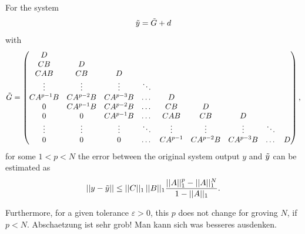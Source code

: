 	\begin{theo}
		For the system 
		\begin{align}
		\tilde{y} = \tilde{G} + d 
		\end{align}
		with 
		\begin{align}
		\tilde{G} = \begin{pmatrix}
		D  \\
		CB & D \\
		C A B & CB & D\\
		\vdots & \vdots & \vdots & \ddots \\
		C A^{p-1} B & C A^{p-2}B & C A^{p-3}B &\dots& D \\
		0           & C A^{p-1} B & C A^{p-2} B & \dots & CB & D\\
		0 & 0 & C A^{p-1} B & \dots & CAB & CB & D \\
		\vdots & \vdots & \vdots & \ddots & \vdots & \vdots & \vdots & \ddots \\
		0 & 0 & 0 & \dots & C A^{p-1}& C A^{p-2}B& CA^{p-3}B &\dots & D
		\end{pmatrix},
		\end{align}
		for some $1<p<N$
		the error between the original system output $y$ and $\tilde{y}$ can be estimated as 
		\begin{align}
		||y - \tilde{y}|| \leq ||C||_1 \, ||B||_1 \frac{||A||_1^p - ||A||_1^{N}}{1 - ||A||_1}. 
		\end{align}
		
		Furthermore, for a given tolerance $\varepsilon>0$, this $p$ does not change for groving $N$, if $p<N$. 
		{\color{red} Abschaetzung ist sehr grob! Man kann sich was besseres ausdenken.}	
		
	\end{theo}
